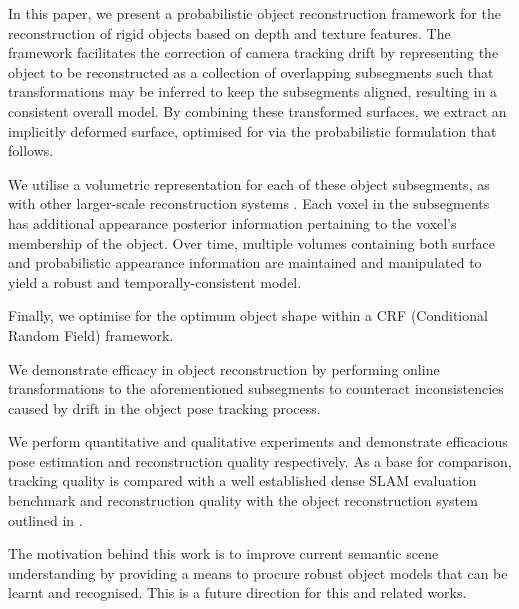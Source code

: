 In this paper, we present a probabilistic object reconstruction framework for the reconstruction of rigid objects based on 
depth and texture features. The framework facilitates the correction of camera tracking drift by representing the object to be reconstructed as a
collection of overlapping subsegments such that transformations may be inferred to keep the subsegments aligned, resulting in a consistent
overall model. By combining these transformed surfaces, we extract an implicitly deformed surface, optimised for via the probabilistic formulation 
that follows.

We utilise a volumetric representation for each of these object subsegments, as with other larger-scale reconstruction
systems \cite{Kahler2016}. Each voxel in the subsegments has additional appearance posterior information pertaining to the voxel's membership 
of the object. Over time, multiple volumes containing both surface and probabilistic appearance information are maintained and manipulated to 
yield a robust and temporally-consistent model.

Finally, we optimise for the optimum object shape within a CRF (Conditional Random Field) framework.

We demonstrate efficacy in object reconstruction by performing online transformations to the aforementioned subsegments to counteract inconsistencies caused by drift in the object pose tracking process.

We perform quantitative and qualitative experiments and demonstrate efficacious pose estimation and reconstruction quality respectively. As a base 
for comparison, tracking quality is compared with a well established dense SLAM evaluation benchmark \cite{sturm12iros} and reconstruction quality 
with the object reconstruction system outlined in \cite{Ren2013}.

The motivation behind this work is to improve current semantic scene understanding\cite{Valentin2015, Golodetz2015} by providing a means to procure 
robust object models that can be learnt and recognised. This is a future direction for this and related works.